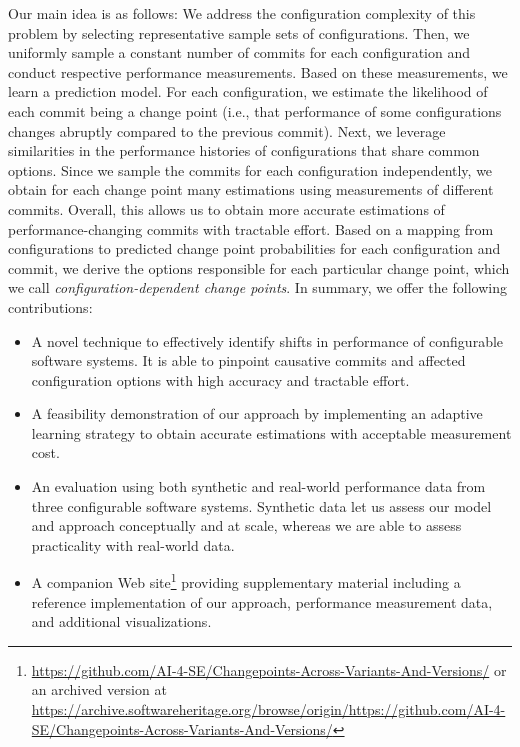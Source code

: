 \documentclass[sigconf, screen]{acmart}
\begin{document}
	Our main idea is as follows: We address the configuration complexity of this problem by selecting representative sample sets of configurations.
	Then, we uniformly sample a constant number of commits for each configuration and conduct respective performance measurements.
	Based on these measurements, we learn a prediction model.
	For each configuration, we estimate the likelihood of each commit being a change point (i.e., that performance of some configurations changes abruptly compared to the previous commit).
	Next, we leverage similarities in the performance histories of configurations that share common options.
	Since we sample the commits for each configuration independently, we obtain for each change point many estimations using measurements of different commits.
	Overall, this allows us to obtain more accurate estimations of performance-changing commits with tractable effort.
	Based on a mapping from configurations to predicted change point probabilities for each configuration and commit, we derive the options responsible for each particular change point, which we call \emph{configuration-dependent change points}. 	
	In summary, we offer the following contributions:
	\begin{itemize}
		\item A novel technique to effectively identify shifts in performance of configurable software systems. It is able to pinpoint causative commits and affected configuration options with high accuracy and tractable effort.
		\item A feasibility demonstration of our approach by implementing an adaptive learning strategy to obtain accurate estimations with acceptable measurement cost.
		\item An evaluation using both synthetic and real-world performance data from three configurable software systems. Synthetic data let us assess our model and approach conceptually and at scale, whereas we are able to assess practicality with real-world data.
		\item A companion Web site\footnote{\url{https://github.com/AI-4-SE/Changepoints-Across-Variants-And-Versions/} or an archived version at \url{https://archive.softwareheritage.org/browse/origin/https://github.com/AI-4-SE/Changepoints-Across-Variants-And-Versions/}} providing supplementary material including a reference implementation of our approach, performance measurement data, and additional visualizations.
	\end{itemize}
	
\end{document}
